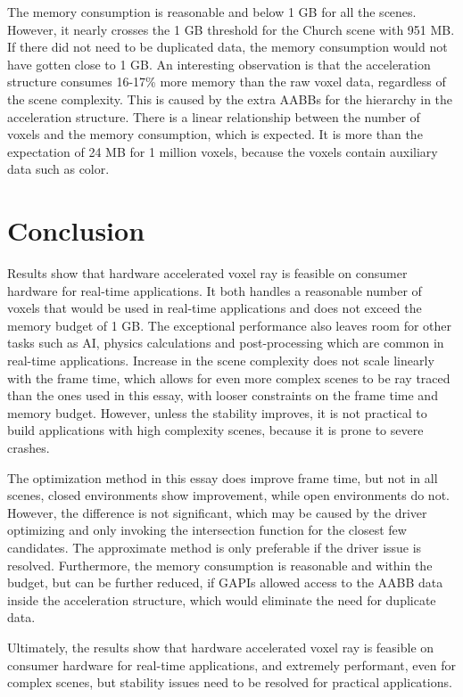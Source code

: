 \documentclass[12pt]{article}
\begin{document}
The memory consumption is reasonable and below 1 GB for all the scenes.
However, it nearly crosses the 1 GB threshold for the Church scene with 951 MB.
If there did not need to be duplicated data, the memory consumption would not have gotten close to 1 GB.
An interesting observation is that the acceleration structure consumes 16-17\% more memory than the raw voxel data, regardless of the scene complexity.
This is caused by the extra AABBs for the hierarchy in the acceleration structure.
There is a linear relationship between the number of voxels and the memory consumption, which is expected.
It is more than the expectation of 24 MB for 1 million voxels, because the voxels contain auxiliary data such as color.

\section{Conclusion}

Results show that hardware accelerated voxel ray is feasible on consumer hardware for real-time applications.
It both handles a reasonable number of voxels that would be used in real-time applications and does not exceed the memory budget of 1 GB.
The exceptional performance also leaves room for other tasks such as AI, physics calculations and post-processing which are common in real-time applications.
Increase in the scene complexity does not scale linearly with the frame time, which allows for even more complex scenes
to be ray traced than the ones used in this essay, with looser constraints on the frame time and memory budget.
However, unless the stability improves, it is not practical to build applications with high complexity scenes,
because it is prone to severe crashes.

The optimization method in this essay does improve frame time, but not in all scenes, closed environments show improvement, while open environments do not.
However, the difference is not significant, which may be caused by the driver optimizing and only invoking the intersection function for the closest few candidates.
The approximate method is only preferable if the driver issue is resolved.
Furthermore, the memory consumption is reasonable and within the budget, but can be further reduced,
if GAPIs allowed access to the AABB data inside the acceleration structure, which would eliminate the need for duplicate data.

Ultimately, the results show that hardware accelerated voxel ray is feasible on consumer hardware for real-time applications,
and extremely performant, even for complex scenes, but stability issues need to be resolved for practical applications.

\printbibliography
\end{document}
